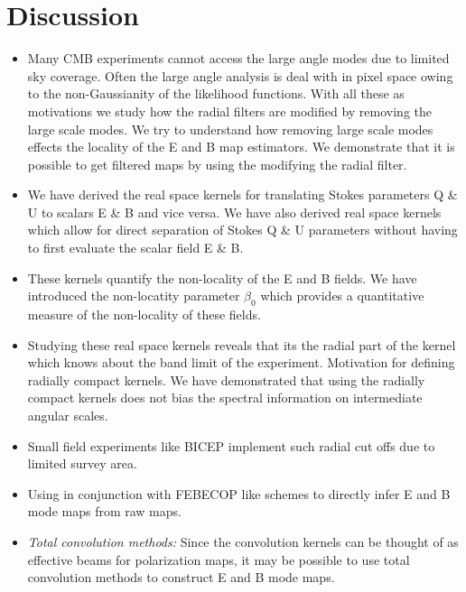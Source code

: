 \section{Discussion}\label{sec:discussion}
\begin{itemize}

\item Many CMB experiments cannot access the large angle modes due to limited sky coverage. Often the large angle analysis is deal with in pixel space owing to the non-Gaussianity of the likelihood functions. With all these as motivations we study how the radial filters are modified by removing the large scale modes. We try to understand how removing large scale modes effects the locality of the E and B map estimators. We demonstrate that it is possible to get filtered maps by using the modifying the radial filter. 

\item We have derived the real space kernels for translating Stokes parameters Q \& U to scalars E \& B and vice versa. We have also derived real space kernels which allow for direct separation of Stokes Q \& U parameters without having to first evaluate the scalar field E \& B.

\item These kernels quantify the non-locality of the E and B fields. We have introduced the non-locatity parameter $\beta_0$ which provides a quantitative measure of the non-locality of these fields.  

\item Studying these real space kernels reveals that its the radial part of the kernel which knows about the band limit of the experiment. Motivation for defining radially compact kernels. We have demonstrated that using the radially compact kernels does not bias the spectral information on intermediate angular scales.

\item Small field experiments like BICEP implement such radial cut offs due to limited survey area. 


\item Using in conjunction with FEBECOP \cite{febecop} like schemes to directly infer E and B mode maps from raw maps.

\item \textit{Total convolution methods:} Since the convolution kernels can be thought of as effective beams for polarization maps, it may be possible to use total convolution methods to construct E and B mode maps.


\end{itemize}
